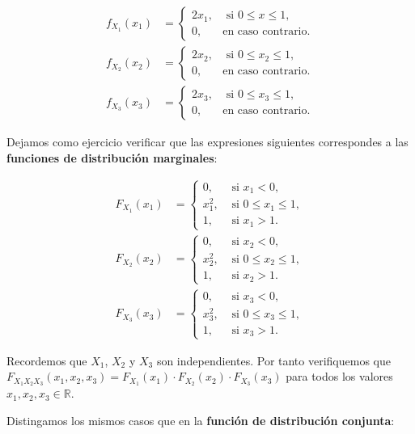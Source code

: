 \documentclass[]{book}
\begin{document}
\[
\begin{array}{rl}
f_{X_1}(x_1) & =\begin{cases}
2x_1, & \mbox{ si }0\leq x\leq 1,\\
0, & \mbox{en caso contrario.}
\end{cases}\\ 
f_{X_2}(x_2)&=\begin{cases}
2x_2, & \mbox{ si }0\leq x_2\leq 1,\\
0, & \mbox{en caso contrario.}
\end{cases}\\ f_{X_3}(x_3) & =\begin{cases}
2x_3, & \mbox{ si }0\leq x_3\leq 1,\\
0, & \mbox{en caso contrario.}
\end{cases}
\end{array}
\]

Dejamos como ejercicio verificar que las expresiones siguientes correspondes a las \textbf{funciones de distribución marginales}:

\[
\begin{array}{rl}
F_{X_1}(x_1) & =\begin{cases}
0, & \mbox{ si }x_1<0, \\
x_1^2, & \mbox{ si }0\leq x_1\leq 1,\\
1, & \mbox{ si }x_1 > 1.
\end{cases}\\
F_{X_2}(x_2) & =\begin{cases}
0, & \mbox{ si }x_2<0, \\
x_2^2, & \mbox{ si }0\leq x_2\leq 1,\\
1, & \mbox{ si }x_2 > 1.
\end{cases}\\ F_{X_3}(x_3) & =\begin{cases}
0, & \mbox{ si }x_3<0, \\
x_3^2, & \mbox{ si }0\leq x_3\leq 1,\\
1, & \mbox{ si }x_3 > 1.
\end{cases}
\end{array}
\]

Recordemos que \(X_1\), \(X_2\) y \(X_3\) son independientes. Por tanto verifiquemos que \(F_{X_1X_2X_3}(x_1,x_2,x_3)=F_{X_1}(x_1)\cdot F_{X_2}(x_2)\cdot F_{X_3}(x_3)\) para todos los valores \(x_1,x_2,x_3\in\mathbb{R}\).

Distingamos los mismos casos que en la \textbf{función de distribución conjunta}:
\end{document}
